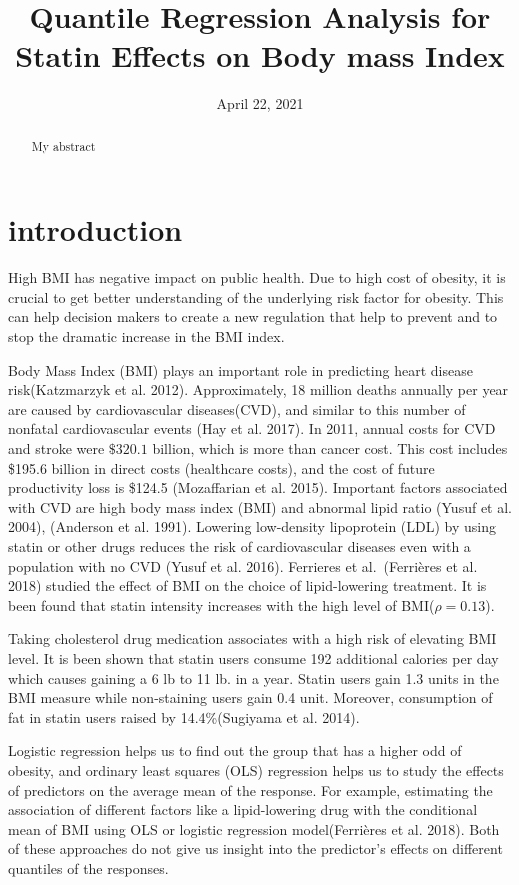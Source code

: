 \documentclass[
  12pt,
]{article}
\title{Quantile Regression Analysis for Statin Effects on Body mass Index}
\author{}
\date{\vspace{-2.5em}April 22, 2021}
\begin{document}
\maketitle
\begin{abstract}
My abstract
\end{abstract}

{
\setcounter{tocdepth}{2}
\tableofcontents
}
\section{introduction}

High BMI has negative impact on public health. Due to high cost of obesity, it is crucial to get better understanding of the underlying risk factor for obesity. This can help decision makers to create a new regulation that help to prevent and to stop the dramatic increase in the BMI index.

Body Mass Index (BMI) plays an important role in predicting heart disease risk(Katzmarzyk et al. 2012). Approximately, 18 million deaths annually per year are caused by cardiovascular diseases(CVD), and similar to this number of nonfatal cardiovascular events (Hay et al. 2017).
In 2011, annual costs for CVD and stroke were \(\$320.1\) billion, which is more than cancer cost. This cost includes \$195.6 billion in direct costs (healthcare costs), and the cost of future productivity loss is \$124.5 (Mozaffarian et al. 2015). Important factors associated with CVD are high body mass index (BMI) and abnormal lipid ratio (Yusuf et al. 2004), (Anderson et al. 1991). Lowering low-density lipoprotein (LDL) by using statin or other drugs reduces the risk of cardiovascular diseases even with a population with no CVD (Yusuf et al. 2016). Ferrieres et al.~(Ferrières et al. 2018) studied the effect of BMI on the choice of lipid-lowering treatment. It is been found that statin intensity increases with the high level of BMI(\(\rho=0.13\)).

Taking cholesterol drug medication associates with a high risk of elevating BMI level. It is been shown that statin users consume 192 additional calories per day which causes gaining a 6 lb to 11 lb. in a year. Statin users gain 1.3 units in the BMI measure while non-staining users gain 0.4 unit. Moreover, consumption of fat in statin users raised by 14.4\%(Sugiyama et al. 2014).

Logistic regression helps us to find out the group that has a higher odd of obesity, and ordinary least squares (OLS) regression helps us to study the effects of predictors on the average mean of the response. For example, estimating the association of different factors like a lipid-lowering drug with the conditional mean of BMI using OLS or logistic regression model(Ferrières et al. 2018). Both of these approaches do not give us insight into the predictor's effects on different quantiles of the responses.
\end{document}
